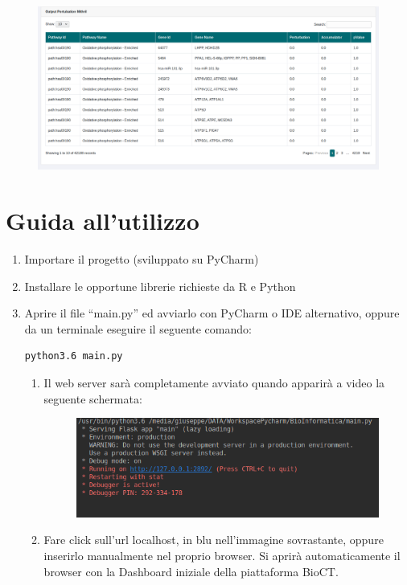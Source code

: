 \documentclass[10pt,a4paper]{report}
\begin{document}
\begin{figure}[H]
\centering%
\vspace{1ex}%
\includegraphics[scale=0.25]{outputMithrilPertubations.png}   
\end{figure}

\chapter{Guida all'utilizzo}

\begin{enumerate}
\item Importare il progetto (sviluppato su PyCharm)
\item Installare le opportune librerie richieste da R e Python
\item Aprire il file “main.py” ed avviarlo con PyCharm o IDE alternativo, oppure da un terminale eseguire il seguente comando:
\begin{verbatim} 
python3.6 main.py 
\end{verbatim}
\begin{enumerate}
\item Il web server sarà completamente avviato quando apparirà a video la seguente schermata:

\begin{figure}[H]
\centering%
\vspace{1ex}%
\includegraphics[scale=0.75]{pycharm.png} 
\end{figure}

\item Fare click sull’url localhost, in blu nell’immagine sovrastante, oppure inserirlo manualmente nel proprio browser. Si aprirà automaticamente il browser con la Dashboard iniziale della piattaforma BioCT.
\end{enumerate}

\end{enumerate}
\end{document}
